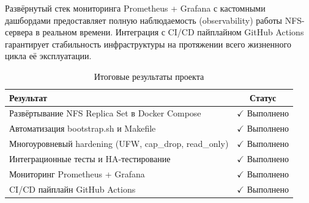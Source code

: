 \documentclass[14pt,a4paper]{extarticle}
\begin{document}
	Развёрнутый стек мониторинга Prometheus + Grafana с кастомными дашбордами предоставляет
	полную наблюдаемость (observability) работы NFS-сервера в реальном времени. Интеграция
	с CI/CD пайплайном GitHub Actions гарантирует стабильность инфраструктуры на
	протяжении всего жизненного цикла её эксплуатации.
	
	\begin{table}[h!]
		\centering
		\small
		\begin{tabular}{|p{11cm}|c|}
			\hline
			\textbf{Результат} & \textbf{Статус} \\
			\hline
			Развёртывание NFS Replica Set в Docker Compose & $\checkmark$ Выполнено \\
			\hline
			Автоматизация bootstrap.sh и Makefile & $\checkmark$ Выполнено \\
			\hline
			Многоуровневый hardening (UFW, cap\_drop, read\_only) & $\checkmark$ Выполнено \\
			\hline
			Интеграционные тесты и HA-тестирование & $\checkmark$ Выполнено \\
			\hline
			Мониторинг Prometheus + Grafana & $\checkmark$ Выполнено \\
			\hline
			CI/CD пайплайн GitHub Actions & $\checkmark$ Выполнено \\
			\hline
		\end{tabular}
		\caption{Итоговые результаты проекта}
	\end{table}
	
\end{document}
